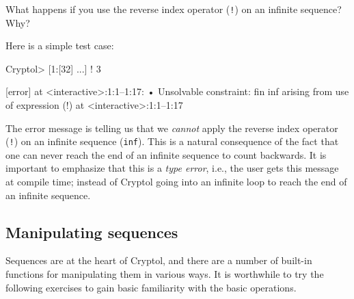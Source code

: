 \restartrepl
\begin{Exercise}\label{ex:seq:10}
  What happens if you use the reverse index operator ({\tt !}) on an
  infinite sequence? Why?
\end{Exercise}
\begin{Answer}
Here is a simple test case:
\begin{replPrompt}
  Cryptol> [1:[32] ...] ! 3

  [error] at <interactive>:1:1--1:17:
    • Unsolvable constraint:
        fin inf
          arising from
          use of expression (!)
          at <interactive>:1:1--1:17
\end{replPrompt}
The error message is telling us that we \emph{cannot} apply the reverse
index operator ({\tt !}) on an infinite sequence (\texttt{inf}).  This
is a natural consequence of the fact that one can never reach the end
of an infinite sequence to count backwards.  It is important to
emphasize that this is a \emph{type error}, i.e., the user gets this
message at compile time; instead of Cryptol going into an infinite
loop to reach the end of an infinite sequence.
\end{Answer}

\subsection{Manipulating sequences}
\label{sec:manip-sequ}

Sequences are at the heart of Cryptol, and there are a number of
built-in functions for manipulating them in various ways.  It is
worthwhile to try the following exercises to gain basic familiarity
with the basic operations.

